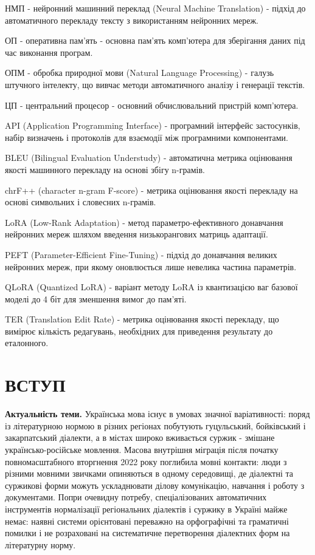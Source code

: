 \documentclass[14pt]{extarticle}
\let\oldaddcontentsline\addcontentsline
\renewcommand{\addcontentsline}[3]{\phantomsection\oldaddcontentsline{#1}{#2}{#3}}
\begin{document}
НМП - нейронний машинний переклад (Neural Machine Translation) - підхід до автоматичного перекладу тексту з використанням нейронних мереж.

ОП - оперативна пам'ять - основна пам'ять комп'ютера для зберігання даних під час виконання програм.

ОПМ - обробка природної мови (Natural Language Processing) - галузь штучного інтелекту, що вивчає методи автоматичного аналізу і генерації текстів.

ЦП - центральний процесор - основний обчислювальний пристрій комп'ютера.

API (Application Programming Interface) - програмний інтерфейс застосунків, набір визначень і протоколів для взаємодії між програмними компонентами.

BLEU (Bilingual Evaluation Understudy) - автоматична метрика оцінювання якості машинного перекладу на основі збігу n-грамів.

chrF++ (character n-gram F-score) - метрика оцінювання якості перекладу на основі символьних і словесних n-грамів.

LoRA (Low-Rank Adaptation) - метод параметро-ефективного донавчання нейронних мереж шляхом введення низькорангових матриць адаптації.

PEFT (Parameter-Efficient Fine-Tuning) - підхід до донавчання великих нейронних мереж, при якому оновлюється лише невелика частина параметрів.

QLoRA (Quantized LoRA) - варіант методу LoRA із квантизацією ваг базової моделі до 4 біт для зменшення вимог до пам'яті.

TER (Translation Edit Rate) - метрика оцінювання якості перекладу, що вимірює кількість редагувань, необхідних для приведення результату до еталонного.

\clearpage

\section*{ВСТУП}

\textbf{Актуальність теми.}
Українська мова існує в умовах значної варіативності: поряд із літературною нормою в різних регіонах побутують гуцульський, бойківський і закарпатський діалекти, а в містах широко вживається суржик - змішане українсько-російське мовлення. Масова внутрішня міграція після початку повномасштабного вторгнення 2022 року поглибила мовні контакти: люди з різними мовними звичками опиняються в одному середовищі, де діалектні та суржикові форми можуть ускладнювати ділову комунікацію, навчання і роботу з документами. Попри очевидну потребу, спеціалізованих автоматичних інструментів нормалізації регіональних діалектів і суржику в Україні майже немає: наявні системи орієнтовані переважно на орфографічні та граматичні помилки і не розраховані на систематичне перетворення діалектних форм на літературну норму.
\end{document}
